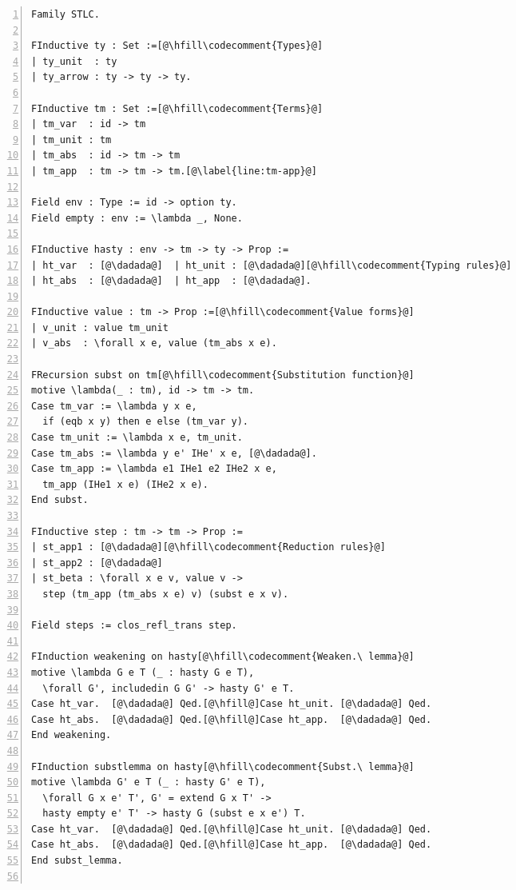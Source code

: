 \begin{figure}
\begin{minipage}{\textwidth}
\begin{multicols}{2}


\begin{lstlisting}[numbers=left]
Family STLC.

FInductive ty : Set :=[@\hfill\codecomment{Types}@]
| ty_unit  : ty
| ty_arrow : ty -> ty -> ty.

FInductive tm : Set :=[@\hfill\codecomment{Terms}@]
| tm_var  : id -> tm
| tm_unit : tm
| tm_abs  : id -> tm -> tm
| tm_app  : tm -> tm -> tm.[@\label{line:tm-app}@]

Field env : Type := id -> option ty.
Field empty : env := \lambda _, None.

FInductive hasty : env -> tm -> ty -> Prop :=
| ht_var  : [@\dadada@]  | ht_unit : [@\dadada@][@\hfill\codecomment{Typing rules}@]
| ht_abs  : [@\dadada@]  | ht_app  : [@\dadada@].

FInductive value : tm -> Prop :=[@\hfill\codecomment{Value forms}@]
| v_unit : value tm_unit
| v_abs  : \forall x e, value (tm_abs x e).

FRecursion subst on tm[@\hfill\codecomment{Substitution function}@] 
motive \lambda(_ : tm), id -> tm -> tm.
Case tm_var := \lambda y x e,
  if (eqb x y) then e else (tm_var y).
Case tm_unit := \lambda x e, tm_unit.
Case tm_abs := \lambda y e' IHe' x e, [@\dadada@].
Case tm_app := \lambda e1 IHe1 e2 IHe2 x e,
  tm_app (IHe1 x e) (IHe2 x e).
End subst.

FInductive step : tm -> tm -> Prop :=
| st_app1 : [@\dadada@][@\hfill\codecomment{Reduction rules}@]
| st_app2 : [@\dadada@]
| st_beta : \forall x e v, value v ->
  step (tm_app (tm_abs x e) v) (subst e x v).

Field steps := clos_refl_trans step.

FInduction weakening on hasty[@\hfill\codecomment{Weaken.\ lemma}@]
motive \lambda G e T (_ : hasty G e T),
  \forall G', includedin G G' -> hasty G' e T.
Case ht_var.  [@\dadada@] Qed.[@\hfill@]Case ht_unit. [@\dadada@] Qed.
Case ht_abs.  [@\dadada@] Qed.[@\hfill@]Case ht_app.  [@\dadada@] Qed.
End weakening.

FInduction substlemma on hasty[@\hfill\codecomment{Subst.\ lemma}@]
motive \lambda G' e T (_ : hasty G' e T),
  \forall G x e' T', G' = extend G x T' ->
  hasty empty e' T' -> hasty G (subst e x e') T.
Case ht_var.  [@\dadada@] Qed.[@\hfill@]Case ht_unit. [@\dadada@] Qed.
Case ht_abs.  [@\dadada@] Qed.[@\hfill@]Case ht_app.  [@\dadada@] Qed.
End subst_lemma.


\end{lstlisting}
\end{multicols}
\end{minipage}
\end{figure}
